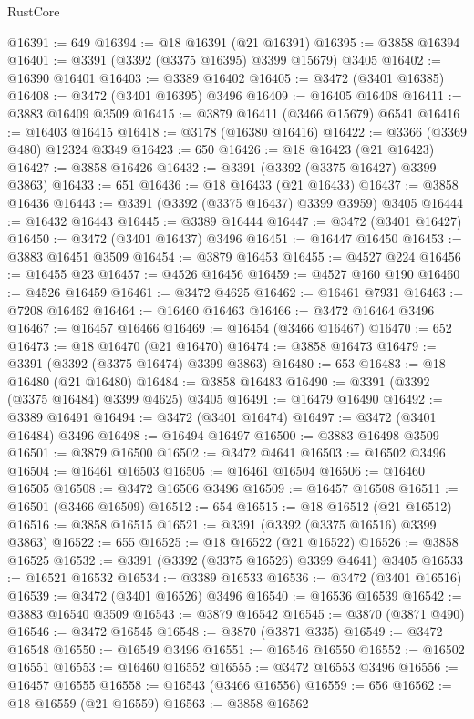 \begin{lexlean}{RustCore}
\begin{coremodule}
@16391 := 649
@16394 := @18 @16391 (@21 @16391)
@16395 := @3858 @16394
@16401 := @3391 (@3392 (@3375 @16395) @3399 @15679) @3405
@16402 := @16390 @16401
@16403 := @3389 @16402
@16405 := @3472 (@3401 @16385)
@16408 := @3472 (@3401 @16395) @3496
@16409 := @16405 @16408
@16411 := @3883 @16409 @3509
@16415 := @3879 @16411 (@3466 @15679) @6541
@16416 := @16403 @16415
@16418 := @3178 (@16380 @16416)
@16422 := @3366 (@3369 @480) @12324 @3349
@16423 := 650
@16426 := @18 @16423 (@21 @16423)
@16427 := @3858 @16426
@16432 := @3391 (@3392 (@3375 @16427) @3399 @3863)
@16433 := 651
@16436 := @18 @16433 (@21 @16433)
@16437 := @3858 @16436
@16443 := @3391 (@3392 (@3375 @16437) @3399 @3959) @3405
@16444 := @16432 @16443
@16445 := @3389 @16444
@16447 := @3472 (@3401 @16427)
@16450 := @3472 (@3401 @16437) @3496
@16451 := @16447 @16450
@16453 := @3883 @16451 @3509
@16454 := @3879 @16453
@16455 := @4527 @224
@16456 := @16455 @23
@16457 := @4526 @16456
@16459 := @4527 @160 @190
@16460 := @4526 @16459
@16461 := @3472 @4625
@16462 := @16461 @7931
@16463 := @7208 @16462
@16464 := @16460 @16463
@16466 := @3472 @16464 @3496
@16467 := @16457 @16466
@16469 := @16454 (@3466 @16467)
@16470 := 652
@16473 := @18 @16470 (@21 @16470)
@16474 := @3858 @16473
@16479 := @3391 (@3392 (@3375 @16474) @3399 @3863)
@16480 := 653
@16483 := @18 @16480 (@21 @16480)
@16484 := @3858 @16483
@16490 := @3391 (@3392 (@3375 @16484) @3399 @4625) @3405
@16491 := @16479 @16490
@16492 := @3389 @16491
@16494 := @3472 (@3401 @16474)
@16497 := @3472 (@3401 @16484) @3496
@16498 := @16494 @16497
@16500 := @3883 @16498 @3509
@16501 := @3879 @16500
@16502 := @3472 @4641
@16503 := @16502 @3496
@16504 := @16461 @16503
@16505 := @16461 @16504
@16506 := @16460 @16505
@16508 := @3472 @16506 @3496
@16509 := @16457 @16508
@16511 := @16501 (@3466 @16509)
@16512 := 654
@16515 := @18 @16512 (@21 @16512)
@16516 := @3858 @16515
@16521 := @3391 (@3392 (@3375 @16516) @3399 @3863)
@16522 := 655
@16525 := @18 @16522 (@21 @16522)
@16526 := @3858 @16525
@16532 := @3391 (@3392 (@3375 @16526) @3399 @4641) @3405
@16533 := @16521 @16532
@16534 := @3389 @16533
@16536 := @3472 (@3401 @16516)
@16539 := @3472 (@3401 @16526) @3496
@16540 := @16536 @16539
@16542 := @3883 @16540 @3509
@16543 := @3879 @16542
@16545 := @3870 (@3871 @490)
@16546 := @3472 @16545
@16548 := @3870 (@3871 @335)
@16549 := @3472 @16548
@16550 := @16549 @3496
@16551 := @16546 @16550
@16552 := @16502 @16551
@16553 := @16460 @16552
@16555 := @3472 @16553 @3496
@16556 := @16457 @16555
@16558 := @16543 (@3466 @16556)
@16559 := 656
@16562 := @18 @16559 (@21 @16559)
@16563 := @3858 @16562

\end{coremodule}
\end{lexlean}

